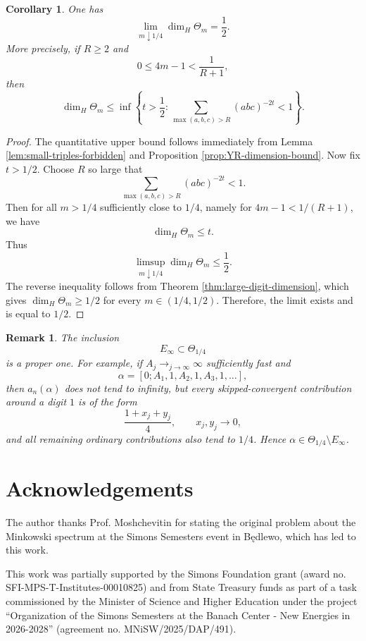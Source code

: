 \documentclass[11pt]{amsart}
\newtheorem{corollary}[theorem]{Corollary}
\newtheorem{remark}[theorem]{Remark}
\begin{document}
\begin{corollary}\label{cor:near-quarter-upper}
One has
$$
\lim_{m\downarrow1/4}\dim_H\Theta_m=\frac12.
$$
More precisely, if $R\ge2$ and
$$
0\le 4m-1<\frac1{R+1},
$$
then
$$
\dim_H\Theta_m
\le
\inf\left\{
t>\frac12:
\sum_{\max(a,b,c)>R}(abc)^{-2t}<1
\right\}.
$$
\end{corollary}

\begin{proof}
The quantitative upper bound follows immediately from Lemma \ref{lem:small-triples-forbidden} and Proposition \ref{prop:YR-dimension-bound}.  Now fix $t>1/2$.  Choose $R$ so large that
$$
\sum_{\max(a,b,c)>R}(abc)^{-2t}<1.
$$
Then for all $m>1/4$ sufficiently close to $1/4$, namely for
$4m-1<1/(R+1)$, we have
$$
\dim_H\Theta_m\le t.
$$
Thus
$$
\limsup_{m\downarrow1/4}\dim_H\Theta_m\le\frac12.
$$
The reverse inequality follows from Theorem \ref{thm:large-digit-dimension}, which gives $\dim_H\Theta_m\ge1/2$ for every $m\in(1/4,1/2)$. Therefore, the limit exists and is equal to $1/2$.
\end{proof}

\begin{remark}\label{rem:theta-quarter-not-only-large-digits}
The inclusion
$$
E_\infty\subset\Theta_{1/4}
$$
is a proper one.  For example, if $A_j\to_{j\to\infty}\infty$ sufficiently fast and
$$
\alpha=[0;A_1,1,A_2,1,A_3,1,\ldots],
$$
then $a_n(\alpha)$ does not tend to infinity, but every skipped-convergent contribution around a digit $1$ is of the form
$$
\frac{1+x_j+y_j}{4},
\qquad
x_j,y_j\to0,
$$
and all remaining ordinary contributions also tend to $1/4$.  Hence
$\alpha\in\Theta_{1/4}\setminus E_\infty$.
\end{remark}



\section*{Acknowledgements}
The author thanks Prof. Moshchevitin for stating the original problem about the Minkowski spectrum at the Simons Semesters event in Będlewo, which has led to this work. 

This work was partially supported by the Simons Foundation grant (award no. SFI-MPS-T-Institutes-00010825) and from State Treasury funds as part of a task commissioned by the Minister of Science and Higher Education under the project “Organization of the Simons Semesters at the Banach Center - New Energies in 2026-2028” (agreement no. MNiSW/2025/DAP/491).
\end{document}

